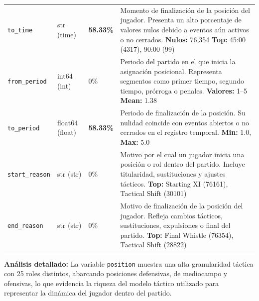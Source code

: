 \documentclass[12pt,a4paper]{article}
\begin{document}
\begin{center}
\begin{longtable}{T{3.5cm} C{2.5cm} C{1.5cm} p{7.0cm}}
\texttt{to\_time} & str \newline (time) & \textcolor{rednull}{\textbf{58.33\%}} & Momento de finalización de la posición del jugador. Presenta un alto porcentaje de valores nulos debido a eventos aún activos o no cerrados. \newline \textbf{Nulos:} 76,354 \newline \textbf{Top:} 45:00 (4317), 90:00 (99) \\

\texttt{from\_period} & int64 \newline (int) & 0\% & Periodo del partido en el que inicia la asignación posicional. Representa segmentos como primer tiempo, segundo tiempo, prórroga o penales. \newline \textbf{Valores:} 1–5 \newline \textbf{Mean:} 1.38 \\

\texttt{to\_period} & float64 \newline (float) & \textcolor{rednull}{\textbf{58.33\%}} & Periodo de finalización de la posición. Su nulidad coincide con eventos abiertos o no cerrados en el registro temporal. \newline \textbf{Min:} 1.0, \textbf{Max:} 5.0 \\

\texttt{start\_reason} & str \newline (str) & 0\% & Motivo por el cual un jugador inicia una posición o rol dentro del partido. Incluye titularidad, sustituciones y ajustes tácticos. \newline \textbf{Top:} Starting XI (76161), Tactical Shift (30101) \\

\texttt{end\_reason} & str \newline (str) & 0\% & Motivo de finalización de la posición del jugador. Refleja cambios tácticos, sustituciones, expulsiones o final del partido. \newline \textbf{Top:} Final Whistle (76354), Tactical Shift (28822) \\

\bottomrule
\end{longtable}
\end{center}
\textbf{Análisis detallado:}  
La variable \texttt{position} muestra una alta granularidad táctica con 25 roles distintos, abarcando posiciones defensivas, de mediocampo y ofensivas, lo que evidencia la riqueza del modelo táctico utilizado para representar la dinámica del jugador dentro del partido.
\end{document}

